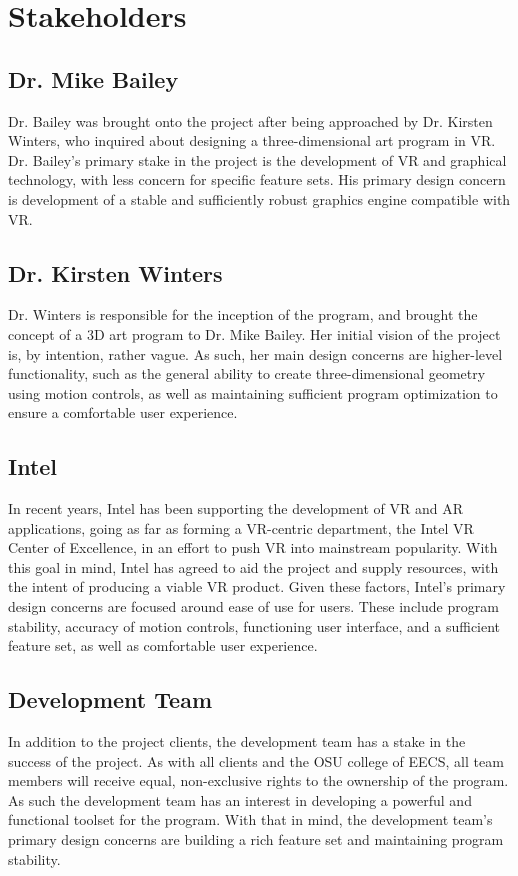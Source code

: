 \documentclass[onecolumn, draftclsnofoot,10pt, compsoc]{IEEEtran}
\begin{document}
\section{Stakeholders}

\subsection{Dr. Mike Bailey}
Dr. Bailey was brought onto the project after being approached by Dr. Kirsten Winters, who inquired about designing a three-dimensional art program in VR. Dr. Bailey’s primary stake in the project is the development of VR and graphical technology, with less concern for specific feature sets. His primary design concern is development of a stable and sufficiently robust graphics engine compatible with VR.
\subsection{Dr. Kirsten Winters}
Dr. Winters is responsible for the inception of the program, and brought the concept of a 3D art program to Dr. Mike Bailey. Her initial vision of the project is, by intention, rather vague. As such, her main design concerns are higher-level functionality, such as the general ability to create three-dimensional geometry using motion controls, as well as maintaining sufficient program optimization to ensure a comfortable user experience.
\subsection{Intel}
In recent years, Intel has been supporting the development of VR and AR applications, going as far as forming a VR-centric department, the Intel VR Center of Excellence, in an effort to push VR into mainstream popularity. With this goal in mind, Intel has agreed to aid the project and supply resources, with the intent of producing a viable VR product. Given these factors, Intel’s primary design concerns are focused around ease of use for users. These include program stability, accuracy of motion controls, functioning user interface, and a sufficient feature set, as well as comfortable user experience. 
\subsection{Development Team}
In addition to the project clients, the development team has a stake in the success of the project. As with all clients and the OSU college of EECS, all team members will receive equal, non-exclusive rights to the ownership of the program. As such the development team has an interest in developing a powerful and functional toolset for the program. With that in mind, the development team’s primary design concerns are building a rich feature set and maintaining program stability.
\end{document}
